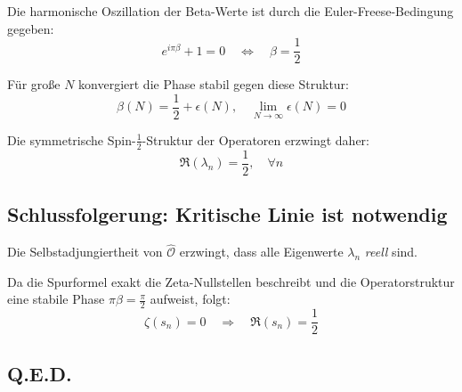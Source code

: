 Die harmonische Oszillation der Beta-Werte ist durch die Euler-Freese-Bedingung gegeben:
\[
e^{i\pi \beta} + 1 = 0 \quad \Leftrightarrow \quad \beta = \frac{1}{2}
\]

Für große \( N \) konvergiert die Phase stabil gegen diese Struktur:
\[
\beta(N) = \frac{1}{2} + \epsilon(N), \quad \lim_{N \to \infty} \epsilon(N) = 0
\]

Die symmetrische Spin-\(\frac{1}{2}\)-Struktur der Operatoren erzwingt daher:
\[
\Re(\lambda_n) = \frac{1}{2}, \quad \forall n
\]

\subsection{Schlussfolgerung: Kritische Linie ist notwendig}

Die Selbstadjungiertheit von \(\hat{\mathcal{O}}\) erzwingt, dass alle Eigenwerte \(\lambda_n\) \emph{reell} sind.

Da die Spurformel exakt die Zeta-Nullstellen beschreibt und die Operatorstruktur eine stabile Phase \( \pi \beta = \frac{\pi}{2} \) aufweist, folgt:
\[
\boxed{
\zeta(s_n) = 0 \quad \Rightarrow \quad \Re(s_n) = \frac{1}{2}
}
\]

\subsection*{Q.E.D.}